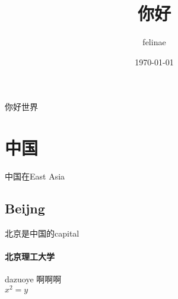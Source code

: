 \documentclass[UTF8]{ctexart}
\title{你好}
\date{\today}
\author{felinae}
\begin{document}
\maketitle
你好世界
\section{中国}
中国在East Asia
\subsection{Beijng}
北京是中国的capital
\paragraph{北京理工大学}
dazuoye 啊啊啊\\
$x^2=y$
\end{document}
